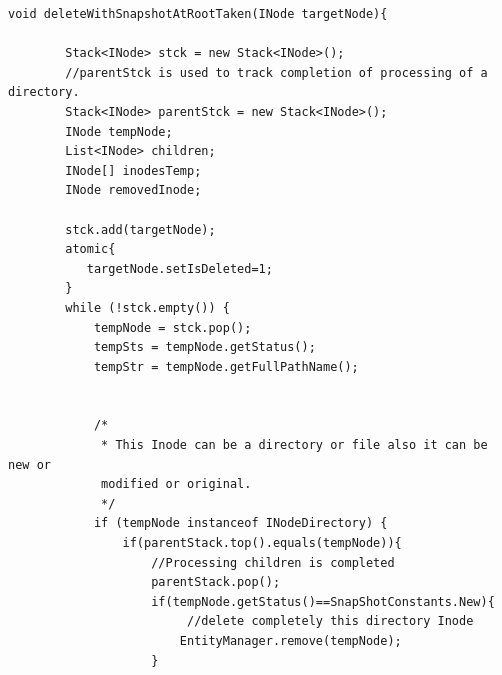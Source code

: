 \begin{enumerate}
%            


\begin{verbatim}
void deleteWithSnapshotAtRootTaken(INode targetNode){

        Stack<INode> stck = new Stack<INode>();
        //parentStck is used to track completion of processing of a directory.
        Stack<INode> parentStck = new Stack<INode>();
        INode tempNode;
        List<INode> children;
        INode[] inodesTemp;
        INode removedInode;

        stck.add(targetNode);
        atomic{
           targetNode.setIsDeleted=1;   
        } 
        while (!stck.empty()) {
            tempNode = stck.pop();
            tempSts = tempNode.getStatus();
            tempStr = tempNode.getFullPathName();
           
            
            /*
             * This Inode can be a directory or file also it can be new or 
             modified or original.
             */
            if (tempNode instanceof INodeDirectory) {
                if(parentStack.top().equals(tempNode)){
                    //Processing children is completed
                    parentStack.pop();
                    if(tempNode.getStatus()==SnapShotConstants.New){
                         //delete completely this directory Inode
                        EntityManager.remove(tempNode);
                    }                
                

\end{verbatim}
\end{enumerate}
